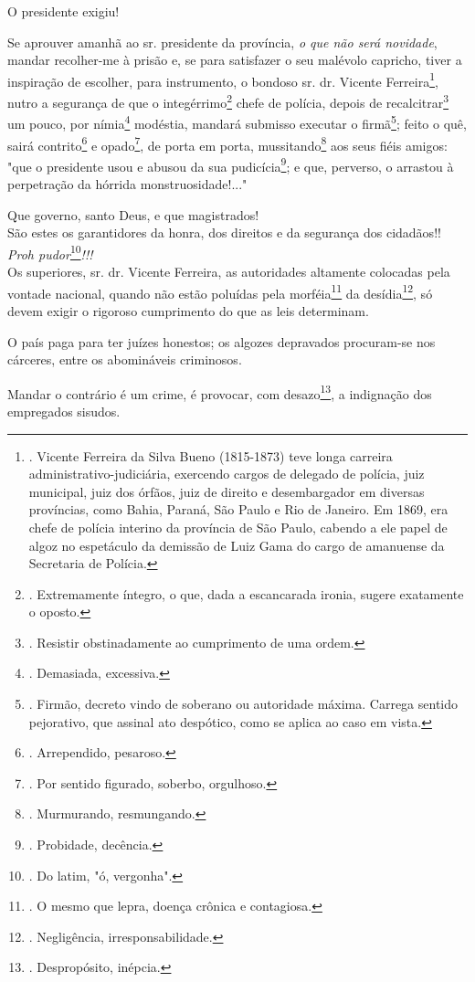 O presidente exigiu!

Se aprouver amanhã ao sr. presidente da província, \emph{o que não será
novidade}, mandar recolher-me à prisão e, se para satisfazer o seu
malévolo capricho, tiver a inspiração de escolher, para instrumento, o
bondoso sr. dr. Vicente Ferreira\footnote{. Vicente Ferreira da Silva
  Bueno (1815-1873) teve longa carreira administrativo-judiciária,
  exercendo cargos de delegado de polícia, juiz municipal, juiz dos
  órfãos, juiz de direito e desembargador em diversas províncias, como
  Bahia, Paraná, São Paulo e Rio de Janeiro. Em 1869, era chefe de
  polícia interino da província de São Paulo, cabendo a ele papel de
  algoz no espetáculo da demissão de Luiz Gama do cargo de amanuense da
  Secretaria de Polícia.}, nutro a segurança de que o
integérrimo\footnote{. Extremamente íntegro, o que, dada a escancarada
  ironia, sugere exatamente o oposto.} chefe de polícia, depois de
recalcitrar\footnote{. Resistir obstinadamente ao cumprimento de uma
  ordem.} um pouco, por nímia\footnote{. Demasiada, excessiva.}
modéstia, mandará submisso executar o firmã\footnote{. Firmão, decreto
  vindo de soberano ou autoridade máxima. Carrega sentido pejorativo,
  que assinal ato despótico, como se aplica ao caso em vista.}; feito o
quê, sairá contrito\footnote{. Arrependido, pesaroso.} e
opado\footnote{. Por sentido figurado, soberbo, orgulhoso.}, de porta em
porta, mussitando\footnote{. Murmurando, resmungando.} aos seus fiéis
amigos: "que o presidente usou e abusou da sua pudicícia\footnote{.
  Probidade, decência.}; e que, perverso, o arrastou à perpetração da
hórrida monstruosidade!..."

Que governo, santo Deus, e que magistrados!\\
São estes os garantidores da honra, dos direitos e da segurança dos
cidadãos!!\\
\emph{Proh pudor}\footnote{. Do latim, "ó, vergonha".}\emph{!!!}\\
Os superiores, sr. dr. Vicente Ferreira, as autoridades altamente
colocadas pela vontade nacional, quando não estão poluídas pela
morféia\footnote{. O mesmo que lepra, doença crônica e contagiosa.} da
desídia\footnote{. Negligência, irresponsabilidade.}, só devem exigir o
rigoroso cumprimento do que as leis determinam.

O país paga para ter juízes honestos; os algozes depravados procuram-se
nos cárceres, entre os abomináveis criminosos.

Mandar o contrário é um crime, é provocar, com desazo\footnote{.
  Despropósito, inépcia.}, a indignação dos empregados sisudos.

